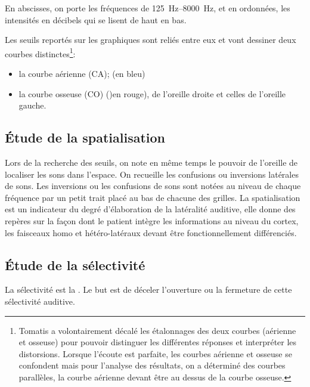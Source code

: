 En abscisses, on porte les fréquences de \SIrange{125}{8000}{\Hz}, et en ordonnées,
les intensités en décibels qui se lisent de haut en bas. 

Les seuils reportés sur les graphiques sont reliés entre eux et vont
dessiner deux courbes distinctes\footnote{Tomatis a volontairement décalé les étalonnages des deux courbes (aérienne
	et osseuse) pour pouvoir distinguer les différentes réponses et interpréter
	les distorsions. Lorsque l'écoute est parfaite, les
	courbes aérienne et osseuse se confondent mais pour l'analyse des
	résultats, on a déterminé des courbes parallèles, la courbe aérienne
	devant être au dessus de la courbe osseuse.}: 
\begin{itemize}
	\item la courbe aérienne (CA); (en bleu)
	\item la courbe osseuse (CO) ()en rouge), de l'oreille droite et celles de l'oreille gauche.
\end{itemize}



\subsection{\'Etude de la spatialisation}

Lors de la recherche des seuils, on note en même temps le pouvoir
de l'oreille de localiser les sons dans l'espace. On recueille les
confusions ou inversions latérales de sons. Les inversions ou les
confusions de sons sont notées au niveau de chaque fréquence par un
petit trait placé au bas de chacune des grilles. La spatialisation
est un indicateur du degré d'élaboration de la latéralité auditive,
elle donne des repères sur la façon dont le patient intègre les informations
au niveau du cortex, les faisceaux homo et hétéro-latéraux devant
être fonctionnellement différenciés. 


\subsection{\'Etude de la sélectivité}

La sélectivité est la \autocite{tomatis:loreille}.
Le but est de déceler l'ouverture ou la fermeture de cette sélectivité
auditive. 

